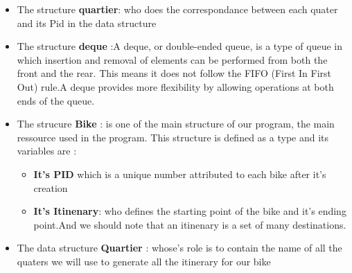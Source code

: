 \begin{itemize}
    \item[\textbullet]The structure \textbf{quartier}: who does the correspondance between each quater and its Pid in the data structure
    \item[\textbullet] The structure \textbf{deque} :A deque, or double-ended queue, is a type of queue in which insertion and removal of elements can be performed from both the front and the rear. This means it does not follow the FIFO (First In First Out) rule.A deque provides more flexibility by allowing operations at both ends of the queue.
    \item[\textbullet] The strucure \textbf {Bike} : is one of the main structure of our program, the main ressource used in the program. This structure is defined as a type and its variables are : \begin{itemize}
        \item \textbf{It's PID} which is a unique number attributed to each bike after it's creation
        \item \textbf{It's Itinenary}: who defines the starting point of the bike and it's ending point.And we should note that an itinenary is a set of many destinations.
    \end{itemize}
    \item[\textbullet] The data structure \textbf{Quartier} : whose's role is to contain the name of all the quaters we will use to generate all the itinerary for our bike
\end{itemize}